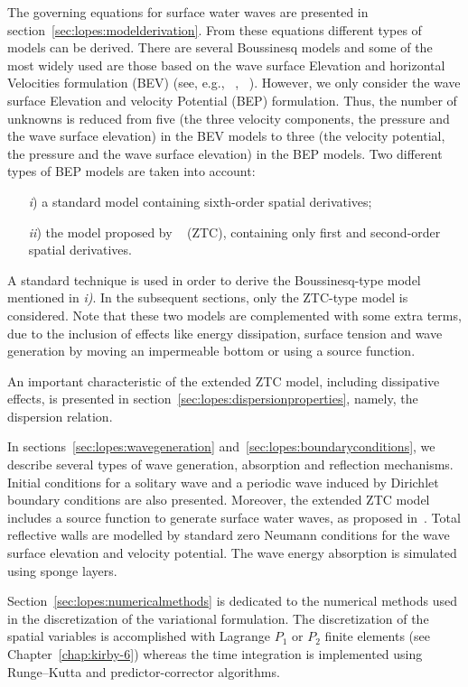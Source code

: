 The governing equations for surface water waves are
presented in section~\ref{sec:lopes:modelderivation}. From
these equations different types of models can be derived.
There are several Boussinesq models and some of the most
widely used are those based on the wave surface Elevation
and horizontal Velocities formulation (BEV) (see, e.g.,
~\cite{LiuWoo2004}, ~\cite{WalkleyBerzins2002}).
However, we only consider the wave surface Elevation and velocity
Potential (BEP) formulation.  Thus, the number of unknowns
is reduced from five (the three velocity components, the
pressure and the wave surface elevation) in the BEV models
to three (the velocity potential, the pressure and the wave
surface elevation) in the BEP models.  Two different types
of BEP models are taken into account:
\begin{itemize}
\item[{\it i})] a standard  model containing sixth-order
  spatial derivatives;
\item[{\it ii})] the  model proposed by
  ~\cite{ZhaoTengCheng2004} (ZTC), containing only first and
  second-order spatial derivatives.
\end{itemize}
A standard technique is used in order to derive the
Boussinesq-type model mentioned in {\it i)}.  In the
subsequent sections, only the ZTC-type model is considered.
Note that these two models are complemented with some extra
terms, due to the inclusion of effects like energy dissipation,
surface tension and wave generation by moving an impermeable
bottom or using a source function.

An important characteristic of the extended ZTC model,
including dissipative effects, is presented in
section~\ref{sec:lopes:dispersionproperties}, namely, the
dispersion relation.

In sections~\ref{sec:lopes:wavegeneration}
and~\ref{sec:lopes:boundaryconditions}, we describe several
types of wave generation, absorption and reflection
mechanisms.  Initial conditions for a solitary wave and a
periodic wave induced by Dirichlet boundary conditions are
also presented.  Moreover, the extended ZTC model includes a
source function to generate surface water waves, as proposed
in~\cite{WeiKirbySinha1999}.  Total reflective walls are
modelled by standard zero Neumann conditions for the wave
surface elevation and velocity potential.  The wave energy
absorption is simulated using sponge layers.

Section~\ref{sec:lopes:numericalmethods} is dedicated to the
numerical methods used in the discretization of the
variational formulation.  The discretization of the spatial
variables is accomplished with Lagrange $P_1$ or $P_2$
finite elements (see Chapter~\ref{chap:kirby-6}) whereas the
time integration is implemented using Runge--Kutta and
predictor-corrector algorithms.

